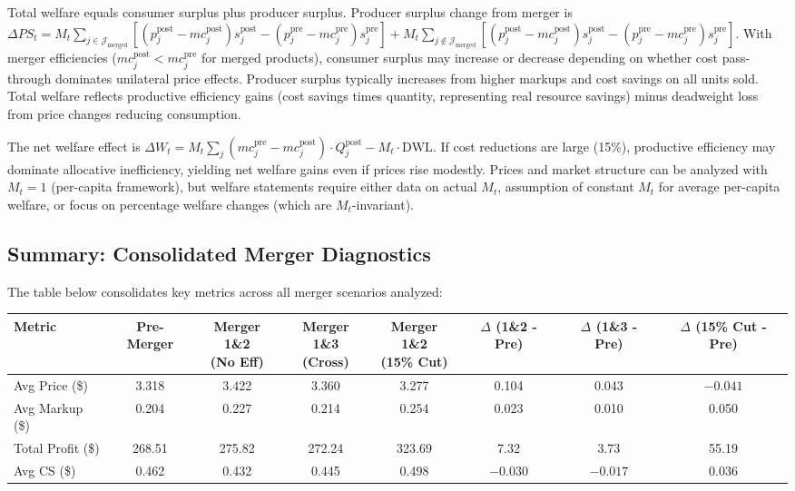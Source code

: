 \documentclass[english,11pt]{article}
\begin{document}
\begin{enumerate}
Total welfare equals consumer surplus plus producer surplus. Producer surplus change from merger is $\Delta PS_t = M_t \sum_{j \in \mathcal{J}_{\text{merged}}} [(p_j^{\text{post}} - mc_j^{\text{post}}) s_j^{\text{post}} - (p_j^{\text{pre}} - mc_j^{\text{pre}}) s_j^{\text{pre}}] + M_t \sum_{j \notin \mathcal{J}_{\text{merged}}} [(p_j^{\text{post}} - mc_j^{\text{post}}) s_j^{\text{post}} - (p_j^{\text{pre}} - mc_j^{\text{pre}}) s_j^{\text{pre}}]$. With merger efficiencies ($mc_j^{\text{post}} < mc_j^{\text{pre}}$ for merged products), consumer surplus may increase or decrease depending on whether cost pass-through dominates unilateral price effects. Producer surplus typically increases from higher markups and cost savings on all units sold. Total welfare reflects productive efficiency gains (cost savings times quantity, representing real resource savings) minus deadweight loss from price changes reducing consumption.

The net welfare effect is $\Delta W_t = M_t \sum_j (mc_j^{\text{pre}} - mc_j^{\text{post}}) \cdot Q_j^{\text{post}} - M_t \cdot \text{DWL}$. If cost reductions are large (15\%), productive efficiency may dominate allocative inefficiency, yielding net welfare gains even if prices rise modestly. Prices and market structure can be analyzed with $M_t = 1$ (per-capita framework), but welfare statements require either data on actual $M_t$, assumption of constant $M_t$ for average per-capita welfare, or focus on percentage welfare changes (which are $M_t$-invariant).

\end{enumerate}

\subsection*{Summary: Consolidated Merger Diagnostics}

The table below consolidates key metrics across all merger scenarios analyzed:

\begin{center}
\small
\begin{tabular}{lccccccc}
\hline
Metric & Pre-Merger & \makecell{Merger 1\&2\\(No Eff)} & \makecell{Merger 1\&3\\(Cross)} & \makecell{Merger 1\&2\\(15\% Cut)} & \makecell{$\Delta$ (1\&2\\- Pre)} & \makecell{$\Delta$ (1\&3\\- Pre)} & \makecell{$\Delta$ (15\% Cut\\- Pre)} \\
\hline
Avg Price (\$) & 3.318 & 3.422 & 3.360 & 3.277 & 0.104 & 0.043 & $-0.041$ \\
Avg Markup (\$) & 0.204 & 0.227 & 0.214 & 0.254 & 0.023 & 0.010 & 0.050 \\
Total Profit (\$) & 268.51 & 275.82 & 272.24 & 323.69 & 7.32 & 3.73 & 55.19 \\
Avg CS (\$) & 0.462 & 0.432 & 0.445 & 0.498 & $-0.030$ & $-0.017$ & 0.036 \\
\hline
\end{tabular}
\end{center}
\end{document}
